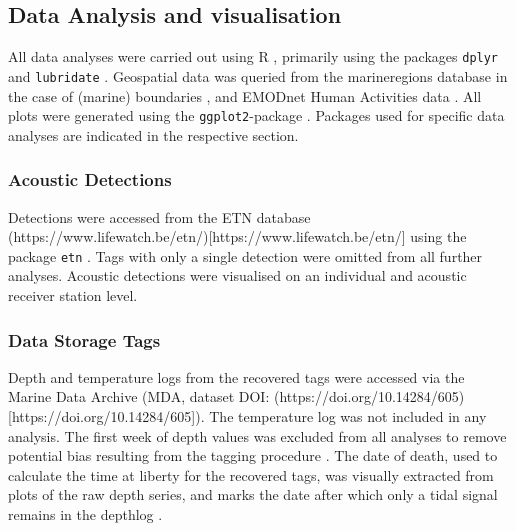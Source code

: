 \documentclass[
  authoryear,
  review,
  3p]{elsarticle}
\begin{document}
\hypertarget{data-analysis-and-visualisation}{%
\subsection{Data Analysis and
visualisation}\label{data-analysis-and-visualisation}}

All data analyses were carried out using R \citep{R_2022}, primarily
using the packages \texttt{dplyr} \citep{dplyr} and \texttt{lubridate}
\citep{lubridate}. Geospatial data was queried from the marineregions
database \citep{claus_2014} in the case of (marine) boundaries
\citep[with the \texttt{mregions2}-package,][]{mregions2}, and EMODnet
Human Activities \citep{solaun_2021} data \citep[with the
\texttt{EMODnetWFS}-package,][]{EMODnetWFS}. All plots were generated
using the \texttt{ggplot2}-package \citep{ggplot2}. Packages used for
specific data analyses are indicated in the respective section.

\hypertarget{acoustic-detections}{%
\subsubsection{Acoustic Detections}\label{acoustic-detections}}

Detections were accessed from the ETN database
(https://www.lifewatch.be/etn/){[}https://www.lifewatch.be/etn/{]} using
the package \texttt{etn} \citep{etn}. Tags with only a single detection
were omitted from all further analyses. Acoustic detections were
visualised on an individual and acoustic receiver station level.

\hypertarget{sec-mm_dsts}{%
\subsubsection{Data Storage Tags}\label{sec-mm_dsts}}

Depth and temperature logs from the recovered tags were accessed via the
Marine Data Archive (MDA, dataset DOI:
(https://doi.org/10.14284/605){[}https://doi.org/10.14284/605{]}). The
temperature log was not included in any analysis. The first week of
depth values was excluded from all analyses to remove potential bias
resulting from the tagging procedure \citep[following][]{flavio_2021}.
The date of death, used to calculate the time at liberty for the
recovered tags, was visually extracted from plots of the raw depth
series, and marks the date after which only a tidal signal remains in
the depthlog \citep[characterised by cyclically rising and falling
depths within a rough 2 m depth range,][]{kvale_2006}.
\end{document}
